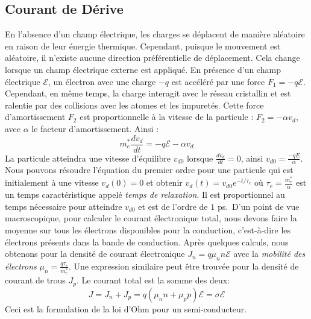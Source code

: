 \subsection{Courant de Dérive}
En l'absence d'un champ électrique, les charges se déplacent de manière aléatoire en raison de leur énergie thermique. Cependant, puisque le mouvement est aléatoire, il n'existe aucune direction préférentielle de déplacement. Cela change lorsque un champ électrique externe est appliqué. En présence d'un champ électrique $\mathcal{E}$, un électron avec une charge $-q$ est accéléré par une force $F_1 = -q \mathcal{E}$. Cependant, en même temps, la charge interagit avec le réseau cristallin et est ralentie par des collisions avec les atomes et les impuretés. Cette force d'amortissement $F_2$ est proportionnelle à la vitesse de la particule : $F_2 = -\alpha v_d$, avec $\alpha$ le facteur d'amortissement. Ainsi :
$$
m_e^* \frac{d v_d}{dt}  = -q \mathcal{E}  - \alpha v_d
$$
La particule atteindra une vitesse d'équilibre $v_{d0}$ lorsque $\frac{d v_d}{dt} = 0$, ainsi $v_{d0} = \frac{-qE}{\alpha}$. Nous pouvons résoudre l'équation du premier ordre pour une particule qui est initialement à une vitesse $v_d(0) = 0$ et obtenir $v_d(t) = v_{d0} e^{-t/ \tau_e}$ où $ \tau_e = \frac{m_e^*}{\alpha}$ est un temps caractéristique appelé \emph{temps de relaxation}. Il est proportionnel au temps nécessaire pour atteindre $v_{d0}$ et est de l'ordre de $1$ ps.\
D'un point de vue macroscopique, pour calculer le courant électronique total, nous devons faire la moyenne sur tous les électrons disponibles pour la conduction, c'est-à-dire les électrons présents dans la bande de conduction. Après quelques calculs, nous obtenons pour la densité de courant électronique $J_n = q \mu_n n \mathcal{E}$ avec la \emph{mobilité des électrons} $\mu_n = \frac{q \tau_e}{m_e^*}$. Une expression similaire peut être trouvée pour la densité de courant de trous $J_p$. Le courant total est la somme des deux:
\begin{equation}
    J = J_n + J_p = q(\mu_n n + \mu_p p) \mathcal{E} = \sigma \mathcal{E}
\end{equation}
Ceci est la formulation de la loi d'Ohm pour un semi-conducteur.
